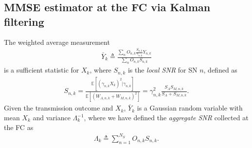 \documentclass[10pt,twocolumn,twoside]{IEEEtran}
\theoremstyle{plain}
\begin{document}
\subsection{MMSE estimator at the FC via Kalman filtering}
\label{P3}
\noindent The weighted average measurement
   \begin{align}
   \label{bari}
\bar Y_{k}\triangleq\frac{\sum_{n}O_{n,k}\frac{S_{n,k}}{\gamma_{n,k}}Y_{n,k}}{\sum_{n}O_{n,k}S_{n,k}}
   \end{align}
   is a sufficient statistic for $X_k$,
   where $S_{n,k}$ is the \emph{local SNR} for SN $n$, defined as
\begin{align}
      \label{Slocal}
   S_{n,k}=\frac{\mathbb E[(\gamma_{n,k}X_{k})^2|\gamma_{n,k}]}{\mathbb E[(W_{A,n,k}+W_{M,n,k})^2]}=
  \gamma_{n,k}^2 \frac{S_{A}S_{M,n,k}}{S_{A}+S_{M,n,k}}.
   \end{align}   
    Given the transmission outcome and $X_k$,
   $\bar Y_k$ is a Gaussian random variable with mean $X_k$ and variance
   $\Lambda_k^{-1}$,
where we have defined the \emph{aggregate SNR} collected at the FC as
\begin{align}
\label{Stot}
\Lambda_k\triangleq\sum_{n=1}^{N_S}O_{n,k}S_{n,k}.
\end{align}
\end{document}
